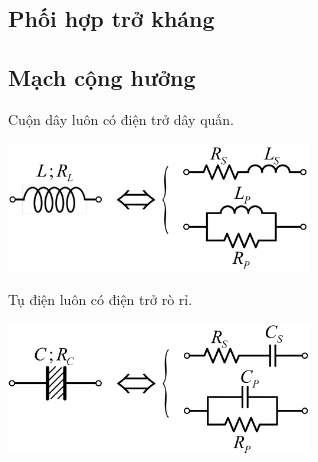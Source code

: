 \subsection{Phối hợp trở kháng}
\subsection{Mạch cộng hưởng}
\textbf{}

Cuộn dây luôn có điện trở dây quấn.
\begin{center}
    \includegraphics[width = 0.6\textwidth]{./image/59.png}
\end{center}

Tụ điện luôn có điện trở rò rỉ.
\begin{center}
    \includegraphics[width = 0.6\textwidth]{./image/60.png}
\end{center}

\textbf{}

